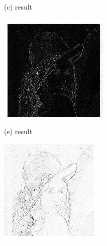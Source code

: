 \documentclass[10pt]{article}
\begin{document}
(c) result

\includegraphics[max width=\textwidth]{2022_01_06_b5ce182ed1bd5f482e5bg-13(3)}

(e) result

\includegraphics[max width=\textwidth]{2022_01_06_b5ce182ed1bd5f482e5bg-13(4)}
\end{document}
